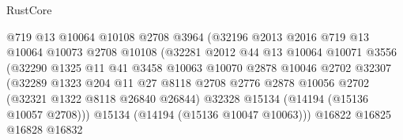 \begin{lexlean}{RustCore}
\begin{coremodule}
                                    @719
                                    @13
                                    @10064
                                    @10108
                                    @2708
                                    @3964
                                    (@32196
                                      @2013
                                      @2016
                                      @719
                                      @13
                                      @10064
                                      @10073
                                      @2708
                                      @10108
                                      (@32281
                                        @2012
                                        @44
                                        @13
                                        @10064
                                        @10071
                                        @3556
                                        (@32290
                                          @1325
                                          @11
                                          @41
                                          @3458
                                          @10063
                                          @10070
                                          @2878
                                          @10046
                                          @2702
                                          @32307
                                          (@32289
                                            @1323
                                            @204
                                            @11
                                            @27
                                            @8118
                                            @2708
                                            @2776
                                            @2878
                                            @10056
                                            @2702
                                            (@32321 @1322 @8118 @26840 @26844)
                                            @32328
                                            @15134
                                            (@14194 (@15136 @10057 @2708)))
                                          @15134
                                          (@14194 (@15136 @10047 @10063)))
                                        @16822
                                        @16825
                                        @16828
                                        @16832

\end{coremodule}
\end{lexlean}
